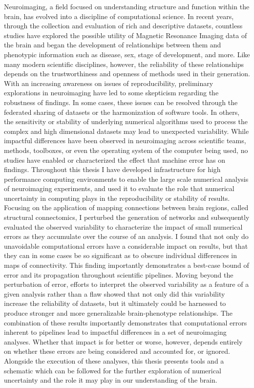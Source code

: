 Neuroimaging, a field focused on understanding structure and function within the brain, has evolved into a
discipline of computational science. In recent years, through the collection and evaluation of rich and
descriptive datasets, countless studies have explored the possible utility of Magnetic Resonance Imaging data
of the brain and began the development of relationships between them and phenotypic information such as
disease, sex, stage of development, and more. Like many modern scientific disciplines, however, the
reliability of these relationships depends on the trustworthiness and openness of methods used in their
generation. With an increasing awareness on issues of reproducibility, preliminary explorations in
neuroimaging have led to some skepticism regarding the robustness of findings. In some cases, these issues
can be resolved through the federated sharing of datasets or the harmonization of software tools. In others,
the sensitivity or stability of underlying numerical algorithms used to process the complex and high
dimensional datasets may lead to unexpected variability. While impactful differences have been observed in
neuroimaging across scientific teams, methods, toolboxes, or even the operating system of the computer being
used, no studies have enabled or characterized the effect that machine error has on findings. Throughout
this thesis I have developed infrastructure for high performance computing environments to enable the large
scale numerical analysis of neuroimaging experiments, and used it to evaluate the role that numerical
uncertainty in computing plays in the reproducibility or stability of results. Focusing on the application of
mapping connections between brain regions, called structural connectomics, I perturbed the generation of
networks and subsequently evaluated the observed variability to characterize the impact of small numerical
errors as they accumulate over the course of an analysis. I found that not only do unavoidable computational
errors have a considerable impact on results, but that they can in some cases be so significant as to obscure
individual differences in maps of connectivity. This finding importantly demonstrates a best-case bound of
error and its propagation throughout scientific pipelines. Moving beyond the perturbation of error, efforts to
interpret the observed variability as a feature of a given analysis rather than a flaw showed that not only did
this variability increase the reliability of datasets, but it ultimately could be harnessed to produce stronger
and more generalizable brain-phenotype relationships. The combination of these results importantly demonstrates
that computational errors inherent to pipelines lead to impactful differences in a set of
neuroimaging analyses. Whether that impact is for better or worse, however, depends entirely on whether these
errors are being considered and accounted for, or ignored. Alongside the execution of these analyses, this
thesis presents tools and a schematic which can be followed for the further exploration of numerical
uncertainty and the role it may play in our understanding of the brain.




